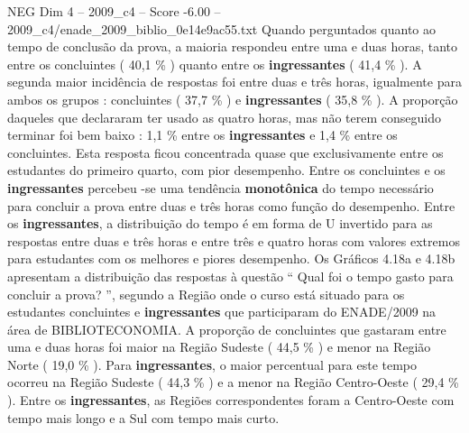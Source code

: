 \begin{textsample}{NEG Dim 4 – 2009\_c4 – Score -6.00 – 2009\_c4/enade\_2009\_biblio\_0e14e9ac55.txt}
Quando perguntados quanto ao tempo de conclusão da prova, a maioria respondeu entre uma e duas horas, tanto entre os concluintes ( 40,1 \% ) quanto entre os \textbf{ingressantes} ( 41,4 \% ).
A segunda maior incidência de respostas foi entre duas e três horas, igualmente para ambos os grupos : concluintes ( 37,7 \% ) e \textbf{ingressantes} ( 35,8 \% ).
A proporção daqueles que declararam ter usado as quatro horas, mas não terem conseguido terminar foi bem baixo : 1,1 \% entre os \textbf{ingressantes} e 1,4 \% entre os concluintes.
Esta resposta ficou concentrada quase que exclusivamente entre os estudantes do primeiro quarto, com pior desempenho.
Entre os concluintes e os \textbf{ingressantes} percebeu -se uma tendência \textbf{monotônica} do tempo necessário para concluir a prova entre duas e três horas como função do desempenho.
Entre os \textbf{ingressantes}, a distribuição do tempo é em forma de U invertido para as respostas entre duas e três horas e entre três e quatro horas com valores extremos para estudantes com os melhores e piores desempenho.
Os Gráficos 4.18a e 4.18b apresentam a distribuição das respostas à questão “ Qual foi o tempo gasto para concluir a prova? ”, segundo a Região onde o curso está situado para os estudantes concluintes e \textbf{ingressantes} que participaram do ENADE/2009 na área de BIBLIOTECONOMIA.
A proporção de concluintes que gastaram entre uma e duas horas foi maior na Região Sudeste ( 44,5 \% ) e menor na Região Norte ( 19,0 \% ).
Para \textbf{ingressantes}, o maior percentual para este tempo ocorreu na Região Sudeste ( 44,3 \% ) e a menor na Região Centro-Oeste ( 29,4 \% ).
Entre os \textbf{ingressantes}, as Regiões correspondentes foram a Centro-Oeste com tempo mais longo e a Sul com tempo mais curto.

\end{textsample}
